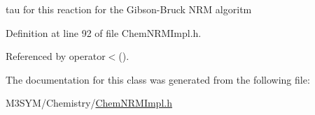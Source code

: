 tau for this reaction for the Gibson-\/\+Bruck N\+R\+M algoritm 



Definition at line 92 of file Chem\+N\+R\+M\+Impl.\+h.



Referenced by operator$<$().



The documentation for this class was generated from the following file\+:\begin{DoxyCompactItemize}
\item 
M3\+S\+Y\+M/\+Chemistry/\hyperlink{ChemNRMImpl_8h}{Chem\+N\+R\+M\+Impl.\+h}\end{DoxyCompactItemize}
